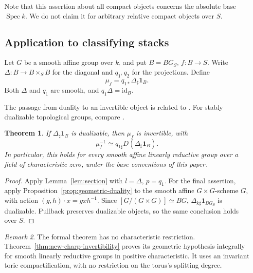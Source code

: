 \documentclass[11pt,reqno]{amsart}
\newtheorem{theorem}{Theorem}[section]
\theoremstyle{definition}
\theoremstyle{remark}
\newtheorem{remark}[theorem]{Remark}
\theoremstyle{plain}
\numberwithin{equation}{section}
\newcommand{\one}{\mathbf 1}
\DeclareMathOperator{\Spec}{Spec}
\begin{document}
Note that this assertion about all compact objects concerns the absolute base
\(\Spec k\). We do not claim it for arbitrary relative compact
objects over \(S\).



\subsection{Application to classifying stacks}
Let \(G\) be a smooth affine group over \(k\), and put \(B=BG_S\), \(f:B\to S\).
Write \(\Delta:B\to B\times_S B\) for the diagonal and \(q_1,q_2\) for the projections.
Define
\begin{equation}\label{eq:new-mu-definition}
 \mu_f=q_{1*}\Delta_\sharp\one_B.
\end{equation}
Both \(\Delta\) and \(q_1\) are smooth, and \(q_1\Delta=\mathrm{id}_B\).

The passage from duality to an invertible object is related to
\cite[Remark~1.4.9]{RaksitTate}.
For stably dualizable topological groups, compare
\cite[Theorems~3.1.4 and~3.3.4]{RognesDualizable}.

\begin{theorem}\label{thm:new-mu-invertible}
If \(\Delta_\sharp\one_B\) is dualizable, then \(\mu_f\) is invertible, with
\begin{equation}\label{eq:new-mu-inverse}
 \mu_f^{-1}\simeq q_{1\sharp}D(\Delta_\sharp\one_B).
\end{equation}
In particular, this holds for every smooth affine linearly reductive group over a field of characteristic zero, 
under the base conventions of this paper.
\end{theorem}
\begin{proof}
Apply Lemma~\ref{lem:section} with \(l=\Delta\), \(p=q_1\).
For the final assertion, apply Proposition~\ref{prop:geometric-duality} to the smooth affine \(G \times G\)-scheme
\(G\), with action \((g,h)\cdot x=gxh^{-1}\).
Since \([G / (G \times G)] \simeq BG\), \(\Delta_{k\sharp} \one_{BG_S} \) is dualizable.
Pullback preserves dualizable objects, so the same conclusion holds over \(S\).
\end{proof}

\begin{remark}\label{rem:new-char-p-invertibility}
The formal theorem has no characteristic restriction.
Theorem~\ref{thm:new-charp-invertibility} proves its geometric hypothesis integrally for smooth
linearly reductive groups in positive characteristic.
It uses an invariant toric compactification, with no restriction on
the torus's splitting degree.
\end{remark}
\end{document}
